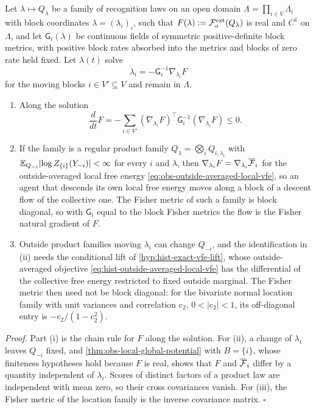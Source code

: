 Let $\lambda\mapsto Q_\lambda$ be a family of recognition laws on an open domain
$\Lambda=\prod_{i\in V}\Lambda_i$ with block coordinates $\lambda=(\lambda_i)_i$,
such that $F(\lambda):=\mathcal F^{\mathrm{ext}}_o(Q_\lambda)$ is real and $C^1$ on
$\Lambda$, and let $\mathsf G_i(\lambda)$ be continuous fields of symmetric
positive-definite block metrics, with positive block rates absorbed into the
metrics and blocks of zero rate held fixed. Let $\lambda(t)$ solve
\begin{equation}
\dot\lambda_i=-\mathsf G_i^{-1}\nabla_{\lambda_i}F
\label{eq:obs-local-natural-gradient}
\end{equation}
for the moving blocks $i\in V'\subseteq V$ and remain in $\Lambda$.
\begin{enumerate}
\item[(i)] Along the solution
\begin{equation}
\frac{d}{dt}F=-\sum_{i\in V'}(\nabla_{\lambda_i}F)^\top\mathsf G_i^{-1}(\nabla_{\lambda_i}F)\leq0.
\label{eq:obs-global-dissipation}
\end{equation}
\item[(ii)] If the family is a regular product family
$Q_\lambda=\bigotimes_iQ_{i,\lambda_i}$ with
$\mathbb E_{Q_{-i}}\lvert\log Z_{\{i\}}(Y_{-i})\rvert<\infty$ for every $i$ and $\lambda$,
then $\nabla_{\lambda_i}F=\nabla_{\lambda_i}\overline{\mathcal F}_i$ for the
outside-averaged local free energy \eqref{eq:obs-outside-averaged-local-vfe}, so
an agent that descends its own local free energy moves along a block of a
descent flow of the collective one. The Fisher metric of such a family is block
diagonal, so with $\mathsf G_i$ equal to the block Fisher metrics the flow is the
Fisher natural gradient of $F$.
\item[(iii)] Outside product families moving $\lambda_i$ can change $Q_{-i}$,
and the identification in (ii) needs the conditional lift of
\cref{hyp:hist-exact-vfe-lift}, whose outside-averaged objective
\eqref{eq:hist-outside-averaged-local-vfe} has the differential of the collective
free energy restricted to fixed outside marginal. The Fisher metric then need not
be block diagonal: for the bivariate normal location family with unit variances
and correlation $\mathrm c_2$, $0<\lvert\mathrm c_2\rvert<1$, its off-diagonal entry
is $-\mathrm c_2/(1-\mathrm c_2^2)$.
\end{enumerate}

\noindent\emph{Proof.}
Part (i) is the chain rule for $F$ along the solution. For (ii), a change of
$\lambda_i$ leaves $Q_{-i}$ fixed, and \cref{thm:obs-local-global-potential} with
$B=\{i\}$, whose finiteness hypotheses hold because $F$ is real, shows that $F$
and $\overline{\mathcal F}_i$ differ by a quantity independent of $\lambda_i$. Scores
of distinct factors of a product law are independent with mean zero, so their
cross covariances vanish. For (iii), the Fisher metric of the location family is
the inverse covariance matrix. $\square$

